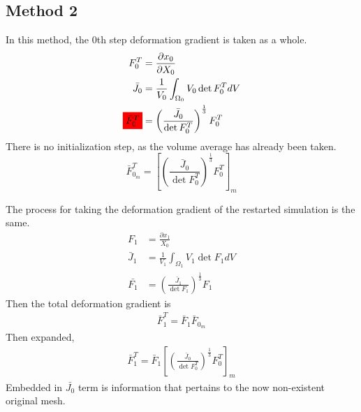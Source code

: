 \subsection{Method 2}
In this method, the 0th step deformation gradient is taken as a whole.
    \begin{align}
        F^T_0 &= \frac{\partial x_0}{\partial X_0}\\
        \bar{J_0} &= \frac{1}{V_0}\int_{\Omega_0}V_0\det{F^T_0}d V\\
        \hl{\bar{F}^T_0} &= \left(\frac{\bar{J}_0}{\det{F^T_0}}\right)^{\frac{1}{3}}F^T_0
    \end{align}
There is no initialization step, as the volume average has already been taken.
\begin{equation}
    \bar{F}^T_{0_m} = \left[\left(\frac{\bar{J}_0}{\det{F^T_0}}\right)^{\frac{1}{3}}F^T_0\right]_m
\end{equation}

The process for taking the deformation gradient of the restarted simulation is the same.
\begin{align}
    F_1 &= \frac{\partial x_1}{X_0}\\
 \bar{J}_{1} &= \frac{1}{V_1}\int_{\Omega_1}V_1\det F_1 dV\\
    \bar{F_1} &= \left(\frac{\bar{J}_{1}}{\det{F_1}}\right)^\frac{1}{3}F_1
\end{align}
Then the total deformation gradient is
\begin{align}
    \bar{F}_1^T = \bar{F}_1\bar{F}_{0_m}
\end{align}
Then expanded,
\begin{align}
    \bar{F}_1^T = \bar{F}_1\left[\left(\frac{\bar{J}_0}{\det{F^T_0}}\right)^{\frac{1}{3}}F^T_0\right]_m
\end{align}
Embedded in $\bar{J_0}$ term is information that pertains to the now non-existent original mesh.
